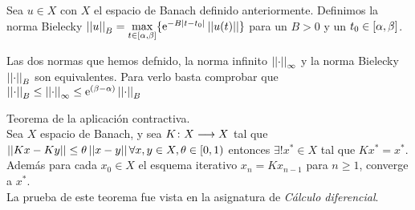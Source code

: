 \begin{defi}
Sea $u\in X$ con $X$ el espacio de Banach definido anteriormente. Definimos la norma Bielecky $\left|\left|u\right|\right|_B=\underset{t\in[\alpha,\beta]}\max\{\mathrm{e}^{-B|t-t_0|}\left|\left|u(t)\right|\right|\}$ para un $B>0$ y un $t_0 \in [\alpha,\beta]$.
\end{defi}

\begin{observacion}Las dos normas que hemos defnido, la norma infinito $\left|\left|\cdot\right|\right|_\infty$ y la norma Bielecky $\left|\left|\cdot\right|\right|_B$ son equivalentes. Para verlo basta comprobar que $\left|\left|\cdot\right|\right|_B \leq \left|\left|\cdot\right|\right|_\infty \leq \mathrm{e}^{(\beta - \alpha)}\left|\left|\cdot\right|\right|_B$
\end{observacion}

\begin{teor} Teorema de la aplicación contractiva.\\
Sea $X$ espacio de Banach, y sea $K\colon X\longrightarrow X$ tal que $\left|\left|Kx-Ky\right|\right| \leq \theta\left|\left|x-y\right|\right| \\
\forall x,y \in X, \theta \in [0,1)$ entonces $\exists! x^* \in X$ tal que $Kx^*=x^*$.\\
Además para cada $x_0 \in X$ el esquema iterativo $x_n=Kx_{n-1}$ para $ n\geq 1$, converge a $x^{*}$.\\
La prueba de este teorema fue vista en la asignatura de \textit{Cálculo diferencial}.
\end{teor}

